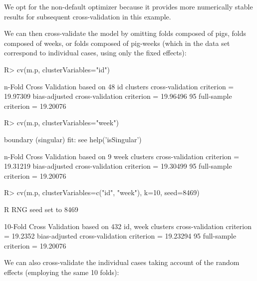 \documentclass[
]{jss}
\begin{document}
We opt for the non-default  optimizer because it provides
more numerically stable results for subsequent cross-validation in this
example.

We can then cross-validate the model by omitting folds composed of pigs,
folds composed of weeks, or folds composed of pig-weeks (which in the
 data set correspond to individual cases, using only the
fixed effects):

\begin{CodeChunk}
\begin{CodeInput}
R> cv(m.p, clusterVariables="id")
\end{CodeInput}
\begin{CodeOutput}
n-Fold Cross Validation based on 48 {id} clusters
cross-validation criterion = 19.97309
bias-adjusted cross-validation criterion = 19.96496
95%
full-sample criterion = 19.20076 
\end{CodeOutput}
\begin{CodeInput}
R> cv(m.p, clusterVariables="week")
\end{CodeInput}
\begin{CodeOutput}
boundary (singular) fit: see help('isSingular')
\end{CodeOutput}
\begin{CodeOutput}
n-Fold Cross Validation based on 9 {week} clusters
cross-validation criterion = 19.31219
bias-adjusted cross-validation criterion = 19.30499
95%
full-sample criterion = 19.20076 
\end{CodeOutput}
\begin{CodeInput}
R> cv(m.p, clusterVariables=c("id", "week"), k=10, seed=8469)
\end{CodeInput}
\begin{CodeOutput}
R RNG seed set to 8469
\end{CodeOutput}
\begin{CodeOutput}
10-Fold Cross Validation based on 432 {id, week} clusters
cross-validation criterion = 19.2352
bias-adjusted cross-validation criterion = 19.23294
95%
full-sample criterion = 19.20076 
\end{CodeOutput}
\end{CodeChunk}

We can also cross-validate the individual cases taking account of the
random effects (employing the same 10 folds):
\end{document}
